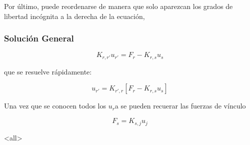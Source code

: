  Por último, puede reordenarse de manera que solo
aparezcan los grados de libertad incógnita a la derecha de la ecuación,

\begin{frame}[label=FrameSolveGeneral]
  \frametitle<presentation>{Solución General}

  \begin{equation}\label{EqReordenoGeneral}
    K_{r,r'} u_{r'} = F_r - K_{r,s} u_s
  \end{equation}

  que se resuelve rápidamente:

  \begin{equation}
    u_{r'} = K_{r',r} \left[ F_r - K_{r,s} u_s \right]
  \end{equation}

  Una vez que se conocen todos los $u_r$a se pueden recuerar las fuerzas de vínculo

  \begin{equation}
    F_s = K_{s,j} u_j
  \end{equation}

\end{frame}


\mode<all>
